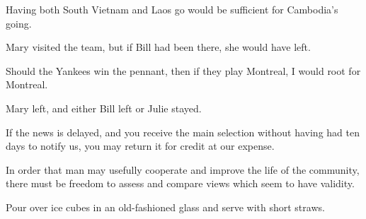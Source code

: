 \begin{enumerate}
\begin{statement}{Having both South Vietnam and Laos go would be sufficient for Cambodia’s going.}
\end{statement}

\begin{statement}{Mary visited the team, but if Bill had been there, she would have left.}
\end{statement}

\begin{statement}{Should the Yankees win the pennant, then if they play Montreal, I would root for Montreal.}
\end{statement}

\begin{statement}{Mary left, and either Bill left or Julie stayed.}
\end{statement}

\begin{statement}{If the news is delayed, and you receive the main selection without having had ten days to notify us, you may return it for credit at our expense.}
\end{statement}

\begin{statement}{In order that man may usefully cooperate and improve the life of the community, there must be freedom to assess and compare views which seem to have validity.}
\end{statement}

\begin{statement}{Pour over ice cubes in an old-fashioned glass and serve with short straws.}
\end{statement}


\end{enumerate}
